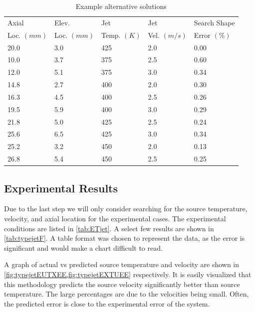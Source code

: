 \documentclass[preprint,12pt]{elsarticle}
\begin{document}
\begin{table}[!t!b!p]
\begin{center}
\begin{tabular}{ l l l l l }
\hline
Axial    		& Elev.		& Jet		  	& Jet			& Search Shape \\
Loc. $(mm)$ & Loc. $(mm)$	& Temp. $(K)$ 	& Vel. $(m/s)$	& Error $(\%)$\\ \hline
20.0 &	3.0	&	425	&	2.0	&	0.00 \\ \hline
10.0 &  3.7 &	375 &	2.5 &	0.60 \\
12.0 &	5.1 &	375	&	3.0	&	0.34 \\
14.8 &	2.7 &	400	&	2.0	&	0.30 \\
16.3 &	4.5 &	400	&	2.5	&	0.26 \\
19.5 &	5.9 &	400	&	3.0	&	0.29 \\
21.8 &	5.0 &	425	&	2.5	&	0.24 \\
25.6 &	6.5 &	425	&	3.0	&	0.34 \\
25.2 &	3.2 &	450	&	2.0	&	0.13 \\
26.8 &	5.4 &	450	&	2.5	&	0.25 \\
\hline
\end{tabular}
\caption{Example alternative solutions\cite{vanderveer}}
\label{tab:alternatives}
\end{center}
\end{table}

\subsection{Experimental Results}
Due to the last step we will only consider searching for the source temperature, velocity, and axial location for the experimental cases.  The experimental conditions are listed in \cref{tab:ETjet}.  A select few results are shown in \cref{tab:typejetF}.  A table format was chosen to represent the data, as the error is significant and would make a chart difficult to read.

A graph of actual vs predicted source temperature and velocity are shown in \cref{fig:typejetEUTXEE,fig:typejetEXTUEE} respectively.  It is easily visualized that this methodology predicts the source velocity significantly better than source temperature.  The large percentages are due to the velocities being small.  Often, the predicted error is close to the experimental error of the system.

\end{document}
